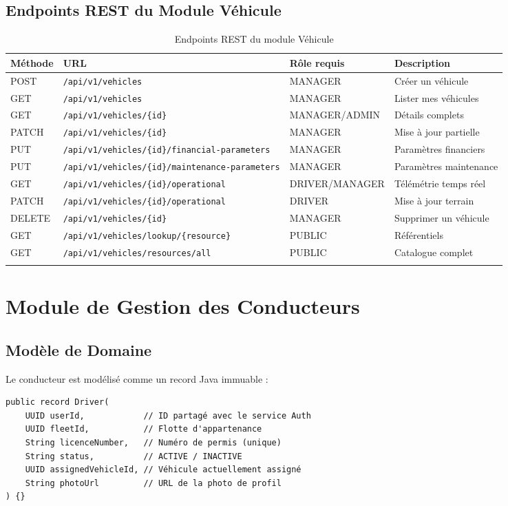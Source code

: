 \documentclass[12pt,a4paper]{report}
\begin{document}
\subsection{Endpoints REST du Module Véhicule}

\begin{longtable}{p{1.5cm}p{6cm}p{2.5cm}p{2.5cm}}
\toprule
\textbf{Méthode} & \textbf{URL} & \textbf{Rôle requis} & \textbf{Description} \\
\midrule
\endhead
POST & \texttt{/api/v1/vehicles} & MANAGER & Créer un véhicule \\
GET & \texttt{/api/v1/vehicles} & MANAGER & Lister mes véhicules \\
GET & \texttt{/api/v1/vehicles/\{id\}} & MANAGER/ADMIN & Détails complets \\
PATCH & \texttt{/api/v1/vehicles/\{id\}} & MANAGER & Mise à jour partielle \\
PUT & \texttt{/api/v1/vehicles/\{id\}/financial-parameters} & MANAGER & Paramètres financiers \\
PUT & \texttt{/api/v1/vehicles/\{id\}/maintenance-parameters} & MANAGER & Paramètres maintenance \\
GET & \texttt{/api/v1/vehicles/\{id\}/operational} & DRIVER/MANAGER & Télémétrie temps réel \\
PATCH & \texttt{/api/v1/vehicles/\{id\}/operational} & DRIVER & Mise à jour terrain \\
DELETE & \texttt{/api/v1/vehicles/\{id\}} & MANAGER & Supprimer un véhicule \\
GET & \texttt{/api/v1/vehicles/lookup/\{resource\}} & PUBLIC & Référentiels \\
GET & \texttt{/api/v1/vehicles/resources/all} & PUBLIC & Catalogue complet \\
\bottomrule
\caption{Endpoints REST du module Véhicule}
\end{longtable}

\section{Module de Gestion des Conducteurs}

\subsection{Modèle de Domaine}

Le conducteur est modélisé comme un record Java immuable :

\begin{lstlisting}[style=javaStyle, caption={Modèle de domaine Driver}]
public record Driver(
    UUID userId,            // ID partagé avec le service Auth
    UUID fleetId,           // Flotte d'appartenance
    String licenceNumber,   // Numéro de permis (unique)
    String status,          // ACTIVE / INACTIVE
    UUID assignedVehicleId, // Véhicule actuellement assigné
    String photoUrl         // URL de la photo de profil
) {}
\end{lstlisting}
\end{document}
